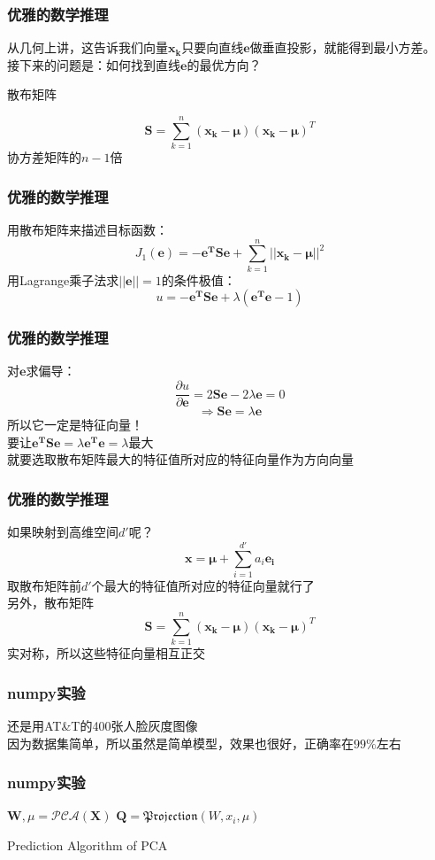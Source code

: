 \documentclass[24pt]{beamer}
\begin{document}
\begin{frame}
\frametitle{优雅的数学推理}
从几何上讲，这告诉我们向量$\mathbf{x_k}$只要向直线$\mathbf{e}$做垂直投影，就能得到最小方差。\\
\bigskip
接下来的问题是：如何找到直线$\mathbf{e}$的最优方向？\\
\begin{center}
散布矩阵
\end{center}
\[ \mathbf{S} = \sum_{k=1}^n (\mathbf{x_k - \mu})(\mathbf{x_k - \mu})^T \]
协方差矩阵的$n-1$倍
\end{frame}
\begin{frame}
\frametitle{优雅的数学推理}
用散布矩阵来描述目标函数：
\[ J_1(\mathbf{e}) = -\mathbf{e^TSe} + \sum_{k=1}^n ||\mathbf{x_k - \mu}||^2 \]
用Lagrange乘子法求$||\mathbf{e}||=1$的条件极值：
\[ u = -\mathbf{e^TSe} + \lambda \left( \mathbf{e^Te} - 1 \right) \]
\end{frame}
\begin{frame}
\frametitle{优雅的数学推理}
对$\mathbf{e}$求偏导：
\[ \frac{\partial u}{\partial \mathbf{e}} = 2\mathbf{Se} - 2\lambda\mathbf{e} = 0 \]
\[ \Rightarrow  \mathbf{Se} = \lambda\mathbf{e} \]
所以它一定是特征向量！\\
要让$\mathbf{e^TSe} = \lambda\mathbf{e^Te} = \lambda$最大\\
就要选取散布矩阵最大的特征值所对应的特征向量作为方向向量
\end{frame}
\begin{frame}
\frametitle{优雅的数学推理}
如果映射到高维空间$d'$呢？
\[ \mathbf{x = \mu} + \sum_{i=1}^{d'} a_i \mathbf{e_i} \]
取散布矩阵前$d'$个最大的特征值所对应的特征向量就行了\\
\bigskip
另外，散布矩阵
\[ \mathbf{S} = \sum_{k=1}^n (\mathbf{x_k - \mu})(\mathbf{x_k - \mu})^T \]
实对称，所以这些特征向量相互正交
\end{frame}
\begin{frame}
\frametitle{numpy实验}
还是用AT\&T的400张人脸灰度图像\\
因为数据集简单，所以虽然是简单模型，效果也很好，正确率在$99\%$左右
\end{frame}
\begin{frame}
\frametitle{numpy实验}
\begin{algorithm}[H]
\SetAlgoLined
$\mathbf{W}, \mu = \mathcal{PCA}(\mathbf{X})$\;
$\mathbf{Q} = \mathfrak{Projection}(W, x_i, \mu)$\;
\caption{Prediction Algorithm of PCA}
\end{algorithm}
\end{frame}
\end{document}
